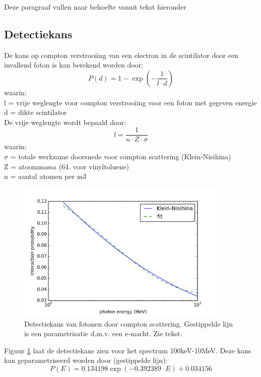 \documentclass[a4paper,11pt]{article}
\begin{document}
Deze paragraaf vullen naar behoefte vanuit tekst hieronder
\subsection{Detectiekans}

De kans op compton verstrooiing van een electron in de scintilator door een invallend foton is kan berekend worden door:
\begin{equation}
P(d) = 1 - \exp(- \frac{1}{l \cdot d})
\end{equation}
waarin:\\
l = vrije weglengte voor compton verstrooiing voor een foton met gegeven energie \\
d = dikte scintilator \\
De vrije weglengte wordt bepaald door:
\begin{equation}
l = \frac{1}{n \cdot Z \cdot \sigma}
\end{equation}
waarin:\\
$\sigma $ = totale werkzame doorsnede voor compton scattering (Klein-Nisihina) \cite{Leo1987}\\
Z = atoommassa (64. voor vinyltoluene) \\
n = aantal atomen per m3 \\

\begin{figure}[t]
  \begin{center}
    \includegraphics[width=0.9\textwidth]{P_fit.png}
    \caption{\label{fig:P_fit} Detectiekans van fotonen door compton scattering. Gestippelde lijn is een parametrisatie d.m.v. een e-macht. Zie tekst.}
  \end{center}
\end{figure}

Figuur \ref{fig:P_fit}  laat de detectiekans zien voor het spectrum 100keV-10MeV.
Deze kans kan geparametriseerd worden door (gestippelde lijn):
\begin{equation}
P(E) = 0.134198 \exp(-0.392389 \cdot E) + 0.034156
\end{equation}
\end{document}
